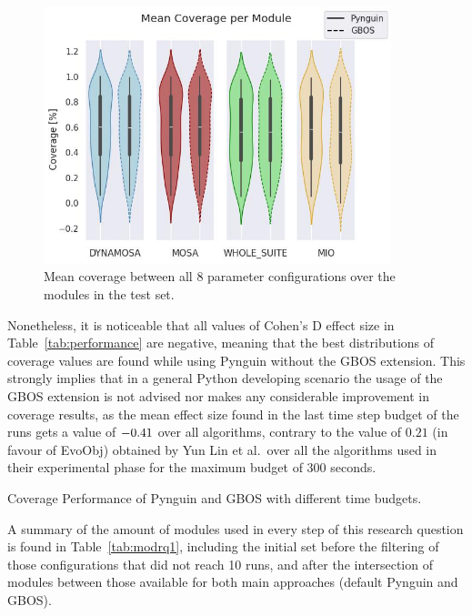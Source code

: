 \documentclass[%
  chapterprefix=false,%
  open=right,%
  twoside=true,%
  paper=a4,%
  logofile={Figures/logo.png},%
  thesistype=master,%
  UKenglish,%
]{se2thesis}
\begin{document}
\begin{figure}[tbh]
  \centering
  \includegraphics[width=0.9\textwidth]{Figures/Results/Coverage.jpg}
  \caption{Mean coverage between all 8 parameter configurations over the modules in the test set.}\label{fig:coverage}
\end{figure}

Nonetheless, it is noticeable that all values of Cohen's D effect size in Table~\ref{tab:performance} are negative, meaning that the best distributions of coverage values are found while using Pynguin without the GBOS extension.
This strongly implies that in a general Python developing scenario the usage of the GBOS extension is not advised nor makes any considerable improvement in coverage results, as the mean effect size found in the last time step budget of the runs gets a value of \(-0.41\) over all algorithms, contrary to the value of \(0.21\) (in favour of EvoObj) obtained by Yun Lin et al.\ over all the algorithms used in their experimental phase for the maximum budget of 300 seconds. 

\begin{table}[h!]
  \centering
  
  \centering
  
  \centering
  
  \caption{Coverage Performance of Pynguin and GBOS with different time budgets.}\label{tab:performance}
\end{table}

A summary of the amount of modules used in every step of this research question is found in Table~\ref{tab:modrq1}, including the initial set before the filtering of those configurations that did not reach 10 runs, and after the intersection of modules between those available for both main approaches (default Pynguin and GBOS).
\end{document}
